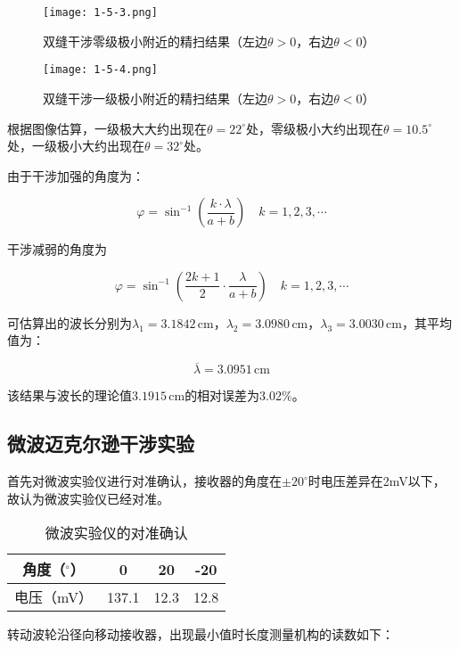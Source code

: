\documentclass[12pt]{article}
\begin{document}
\newpage

\begin{figure}[h!]
    \centering
    \texttt{[image: 1-5-3.png]}
    \caption{双缝干涉零级极小附近的精扫结果（左边$\theta>0$，右边$\theta<0$）}
\end{figure}

\begin{figure}[h!]
    \centering
    \texttt{[image: 1-5-4.png]}
    \caption{双缝干涉一级极小附近的精扫结果（左边$\theta>0$，右边$\theta<0$）}
\end{figure}

根据图像估算，一级极大大约出现在$\theta=22^\circ$处，零级极小大约出现在$\theta=10.5^\circ$处，一级极小大约出现在$\theta=32^\circ$处。

由于干涉加强的角度为：

\[
    \varphi=\sin^{-1}\left(\frac{k\cdot\lambda}{a+b}\right)\quad k=1,2,3,\cdots
\]

干涉减弱的角度为

\[
    \varphi=\sin^{-1}\left(\frac{2k+1}{2}\cdot\frac{\lambda}{a+b}\right)\quad k=1,2,3,\cdots
\]

可估算出的波长分别为$\lambda_1=3.1842\,\mathrm{cm}$，$\lambda_2=3.0980\,\mathrm{cm}$，$\lambda_3=3.0030\,\mathrm{cm}$，其平均值为：

\[
    \overline{\lambda}=3.0951\,\mathrm{cm}
\]

该结果与波长的理论值$3.1915\,\mathrm{cm}$的相对误差为3.02\%。

\subsection{微波迈克尔逊干涉实验}
首先对微波实验仪进行对准确认，接收器的角度在$\pm20^\circ$时电压差异在2mV以下，故认为微波实验仪已经对准。

\newpage

\begin{table}[htbp]
    \centering
    \begin{tabular}{|c|c|c|c|}
    \hline
    角度（$^\circ$） & 0     & 20   & -20  \\ \hline
    电压（mV）       & 137.1 & 12.3 & 12.8 \\ \hline
    \end{tabular}
    \caption{微波实验仪的对准确认}
\end{table}

转动波轮沿径向移动接收器，出现最小值时长度测量机构的读数如下：
\end{document}
